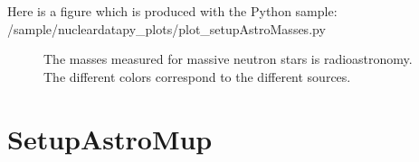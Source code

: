 \documentclass[letterpaper,10pt,english]{sphinxmanual}
\begin{document}
\sphinxAtStartPar
Here is a figure which is produced with the Python sample: /sample/nucleardatapy\_plots/plot\_setupAstroMasses.py

\begin{figure}[htbp]
\centering
\capstart

\noindent{}
\caption{The masses measured for massive neutron stars is radio\sphinxhyphen{}astronomy. The different colors correspond to the different sources.}\label{\detokenize{source/api/setup_astro_masses:id1}}\end{figure}

\sphinxstepscope


\section{SetupAstroMup}
\label{\detokenize{source/api/setup_astro_mup:setupastromup}}\label{\detokenize{source/api/setup_astro_mup::doc}}\label{\detokenize{source/api/setup_astro_mup:module-nucleardatapy.setup_astro_mup}}
\end{document}
